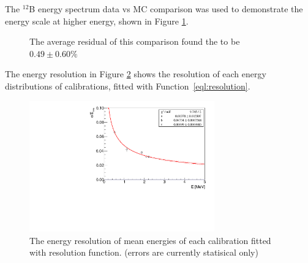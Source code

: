 The $^{12}$B energy spectrum data vs MC comparison was used to demonstrate the energy scale at higher energy, shown in Figure \ref{fig:B12final}. 

\begin{figure}[h!]
\centering
{} \quad
{} \quad
\caption{The average residual of this comparison found the to be $0.49 \pm 0.60\%$}
\label{fig:B12final}
\end{figure}

The energy resolution in Figure \ref{fig:resolution} shows the resolution of each energy distributions of calibrations, fitted with Function~\ref{eql:resolution}.

\begin{figure}[h!]
\centering
\includegraphics[width=80mm]{Figures/Resolution.pdf}
\caption{The energy resolution of mean energies of each calibration fitted with resolution function. (errors are currently statisical only)}
\label{fig:resolution}
\end{figure}


